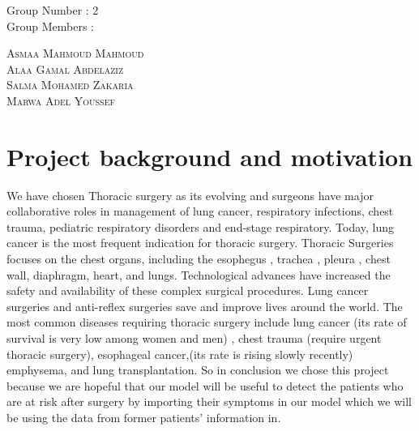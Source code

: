 \documentclass[a4paper, 11pt, oneside]{article} %
\begin{document}
\begin{titlepage}
	
	Group Number : 2\\
         \vspace{1\baselineskip} 
        Group Members :
	
	\vspace{0.5\baselineskip} %
  
	
	{\scshape\Large Asmaa Mahmoud Mahmoud\\ Alaa Gamal Abdelaziz\\Salma Mohamed Zakaria\\Marwa Adel Youssef\\} %
	
	
	
	\vfill %
	
	

	
	\vspace{0.3\baselineskip} %
	
	
	

\end{titlepage}

\section{Project background and motivation}

We have chosen Thoracic surgery as its evolving and surgeons have major collaborative roles in management of lung cancer, respiratory infections, chest trauma, pediatric respiratory disorders and end-stage respiratory. Today, lung cancer is the most frequent indication for thoracic surgery.
Thoracic Surgeries focuses on the chest organs, including the esophegus , trachea , pleura , chest wall, diaphragm, heart, and lungs. Technological advances have increased the safety and availability of these complex surgical procedures. Lung cancer surgeries and anti-reflex surgeries save and improve lives around the world.
The most common diseases requiring thoracic surgery include lung cancer (its rate of survival is very low among women and men) , chest trauma (require urgent thoracic surgery), esophageal cancer,(its rate is rising slowly recently) emphysema, and lung transplantation.
So in conclusion we chose this project because we are hopeful that our model will be useful to detect the patients who are at risk after surgery by importing their symptoms in our model which we will be using the data from former patients’ information in.\cite{encyclopedia} 
\newpage
\end{document}
